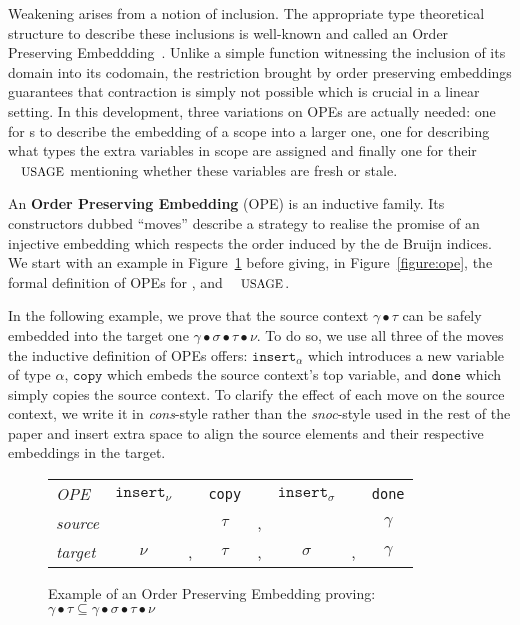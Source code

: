 \documentclass[a4paper,UKenglish]{lipics-v2016}
\begin{document}
Weakening arises from a notion of inclusion. The appropriate type
theoretical structure to describe these inclusions is well-known
and called an Order Preserving Embeddding~\cite{chapman2009thesis,altenkirch1995categorical}.
Unlike a simple function witnessing the inclusion of its domain
into its codomain, the restriction brought by order preserving
embeddings guarantees that contraction is simply not possible which
is crucial in a linear setting. In this development, three variations
on OPEs are actually needed: one for \Nat{}s to describe the embedding
of a scope into a larger one, one for \Context{} describing what types
the extra variables in scope are assigned and finally one for their
$\Usages{}$ mentioning whether these variables are fresh or stale.

\begin{definition}
An \textbf{Order Preserving Embedding} (OPE) is an inductive family. Its
constructors dubbed ``moves'' describe a strategy to realise the promise
of an injective embedding which respects the order induced by the de Bruijn
indices. We start with an example in Figure~\ref{figure:exampleOpe} before
giving, in Figure~\ref{figure:ope}, the formal definition of OPEs for \Nat{},
\Context{} and $\Usages{}$.
\end{definition}

In the following example, we prove that the source context $\gamma ∙ \tau$
can be safely embedded into the target one $\gamma ∙ \sigma ∙ \tau ∙ \nu$.
To do so, we use all three of the moves the inductive definition of OPEs
offers: $\texttt{insert}_{\alpha}$ which introduces a new variable of type
$\alpha$, $\texttt{copy}$ which embeds the source context's top variable,
and $\texttt{done}$ which simply copies the source context. To clarify the
effect of each move on the source context, we write it in \textit{cons}-style
rather than the \textit{snoc}-style used in the rest of the paper and insert
extra space to align the source elements and their respective embeddings in
the target.

\begin{figure}[ht]\centering
\begin{tabular}{l|ccccccc}
\textit{OPE} & $\texttt{insert}_{\nu}$ &
             & \texttt{copy} &
             & $\texttt{insert}_{\sigma}$ &
             & \texttt{done}\\
\textit{source} & & 
                & $\tau$ & , 
                & &
                & $\gamma$ \\
\textit{target} & $\nu$ & ,
                & $\tau$ & ,
                & $\sigma$ & ,
                & $\gamma$ \\
\end{tabular}
\caption{Example of an Order Preserving Embedding proving:
         $\gamma ∙ \tau
          \subseteq
          \gamma ∙ \sigma ∙ \tau ∙ \nu$\label{figure:exampleOpe}}
\end{figure}
\end{document}
